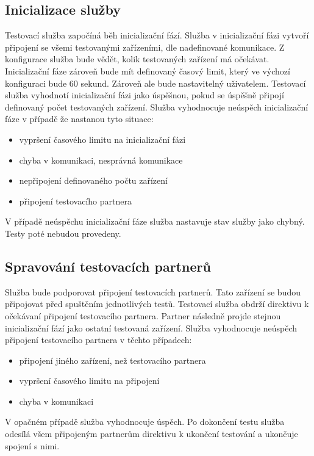 \subsection{Inicializace služby}
Testovací služba započíná běh inicializační fází. Služba v inicializační fázi vytvoří připojení se všemi testovanými zařízeními, dle nadefinované komunikace. Z konfigurace služba bude vědět, kolik testovaných zařízení má očekávat. Inicializační fáze zároveň bude mít definovaný časový limit, který ve výchozí konfiguraci bude 60 sekund. Zároveň ale bude nastavitelný uživatelem. Testovací služba vyhodnotí inicializační fázi jako úspěšnou, pokud se úspěšně připojí definovaný počet testovaných zařízení. Služba vyhodnocuje neúspěch inicializační fáze v případě že nastanou tyto situace:

\begin{itemize}
    \item vypršení časového limitu na inicializační fázi
    \item chyba v komunikaci, nesprávná komunikace
    \item nepřipojení definovaného počtu zařízení
    \item připojení testovacího partnera
\end{itemize}

V případě neúspěchu inicializační fáze služba nastavuje stav služby jako chybný. Testy poté nebudou provedeny.

\subsection{Spravování testovacích partnerů}
Služba bude podporovat připojení testovacích partnerů. Tato zařízení se budou připojovat před spuštěním jednotlivých testů. Testovací služba obdrží direktivu k očekávaní připojení testovacího partnera. Partner následně projde stejnou inicializační fází jako ostatní testovaná zařízení. Služba vyhodnocuje neúspěch připojení testovacího partnera v těchto případech:

\begin{itemize}
    \item připojení jiného zařízení, než testovacího partnera
    \item vypršení časového limitu na připojení
    \item chyba v komunikaci
\end{itemize}

V opačném případě služba vyhodnocuje úspěch. Po dokončení testu služba odesílá všem připojeným partnerům direktivu k ukončení testování a ukončuje spojení s nimi. 

